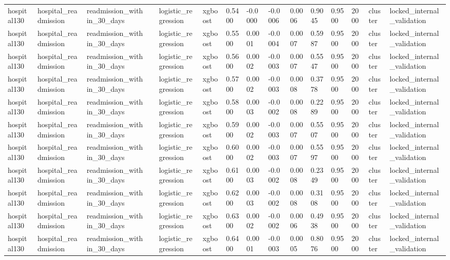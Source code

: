 \begin{tabular}{lllllllllllllll}
hospital130 & hospital\_readmission & readmission\_within\_30\_days &  & logistic\_regression & xgboost & 0.5400 & -0.0000 & -0.0006 & 0.0006 & 0.9045 & 0.9500 & 2000 & cluster & locked\_internal\_validation \\
hospital130 & hospital\_readmission & readmission\_within\_30\_days &  & logistic\_regression & xgboost & 0.5500 & 0.0001 & -0.0004 & 0.0007 & 0.5987 & 0.9500 & 2000 & cluster & locked\_internal\_validation \\
hospital130 & hospital\_readmission & readmission\_within\_30\_days &  & logistic\_regression & xgboost & 0.5600 & 0.0002 & -0.0003 & 0.0007 & 0.5547 & 0.9500 & 2000 & cluster & locked\_internal\_validation \\
hospital130 & hospital\_readmission & readmission\_within\_30\_days &  & logistic\_regression & xgboost & 0.5700 & 0.0002 & -0.0003 & 0.0008 & 0.3778 & 0.9500 & 2000 & cluster & locked\_internal\_validation \\
hospital130 & hospital\_readmission & readmission\_within\_30\_days &  & logistic\_regression & xgboost & 0.5800 & 0.0003 & -0.0002 & 0.0008 & 0.2289 & 0.9500 & 2000 & cluster & locked\_internal\_validation \\
hospital130 & hospital\_readmission & readmission\_within\_30\_days &  & logistic\_regression & xgboost & 0.5900 & 0.0002 & -0.0003 & 0.0007 & 0.5507 & 0.9500 & 2000 & cluster & locked\_internal\_validation \\
hospital130 & hospital\_readmission & readmission\_within\_30\_days &  & logistic\_regression & xgboost & 0.6000 & 0.0002 & -0.0003 & 0.0007 & 0.5597 & 0.9500 & 2000 & cluster & locked\_internal\_validation \\
hospital130 & hospital\_readmission & readmission\_within\_30\_days &  & logistic\_regression & xgboost & 0.6100 & 0.0003 & -0.0002 & 0.0008 & 0.2349 & 0.9500 & 2000 & cluster & locked\_internal\_validation \\
hospital130 & hospital\_readmission & readmission\_within\_30\_days &  & logistic\_regression & xgboost & 0.6200 & 0.0003 & -0.0002 & 0.0008 & 0.3108 & 0.9500 & 2000 & cluster & locked\_internal\_validation \\
hospital130 & hospital\_readmission & readmission\_within\_30\_days &  & logistic\_regression & xgboost & 0.6300 & 0.0002 & -0.0002 & 0.0006 & 0.4938 & 0.9500 & 2000 & cluster & locked\_internal\_validation \\
hospital130 & hospital\_readmission & readmission\_within\_30\_days &  & logistic\_regression & xgboost & 0.6400 & 0.0001 & -0.0003 & 0.0005 & 0.8076 & 0.9500 & 2000 & cluster & locked\_internal\_validation \\

\end{tabular}
